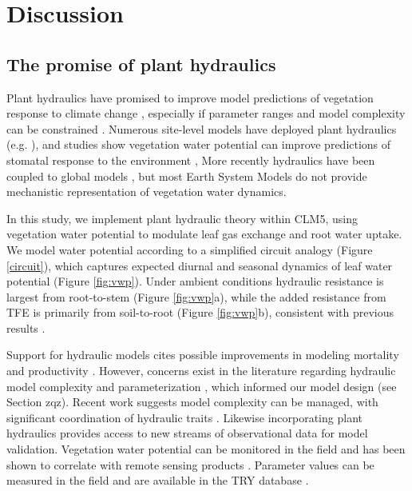 \documentclass[draft,linenumbers]{agujournal}
\begin{document}
    
\section{Discussion}
\subsection{The promise of plant hydraulics}
    Plant hydraulics have promised to improve model predictions of vegetation response to climate change \citep{sperry2015}, 
    especially if parameter ranges and model complexity can be constrained \citep{rogers2017}.
    Numerous site-level models have deployed plant hydraulics (e.g. \citet{williams1996,sperry1998,bohrer2005}), and studies show
    vegetation water potential can improve predictions of stomatal response to the environment \citep{sperry2017,anderegg2017},
    More recently hydraulics have been coupled to global models \citep{bonan2014,xu2016,christoffersen2016}, 
    but most Earth System Models do not provide mechanistic representation of vegetation water dynamics.

    In this study, we implement plant hydraulic theory within CLM5, 
    using vegetation water potential to modulate leaf gas exchange and root water uptake.
    We model water potential according to a simplified circuit analogy (Figure \ref{circuit}), which captures expected diurnal and seasonal dynamics of leaf water potential (Figure \ref{fig:vwp}).
    Under ambient conditions hydraulic resistance is largest from root-to-stem (Figure \ref{fig:vwp}a), 
    while the added resistance from TFE is primarily from soil-to-root (Figure \ref{fig:vwp}b), consistent with previous results \citep{fisher2006}.

    Support for hydraulic models cites possible improvements in modeling mortality and productivity \citep{mcdowell2018,choat2012}.
    However, concerns exist in the literature regarding hydraulic model complexity and parameterization \citep{verhoef2014,drake2017}, 
    which informed our model design (see Section zqz).
    Recent work suggests model complexity can be managed, with significant coordination of hydraulic traits \citep{bartlett2016,christoffersen2016}.
    Likewise incorporating plant hydraulics provides access to new streams of observational data for model validation.
    Vegetation water potential can be monitored in the field \citep{boyer1967} and has been shown to correlate with remote sensing products \citep{momen2017}.
    Parameter values can be measured in the field \citep{sack2002} and are available in the TRY database \citep{kattge2011}.
\end{document}
